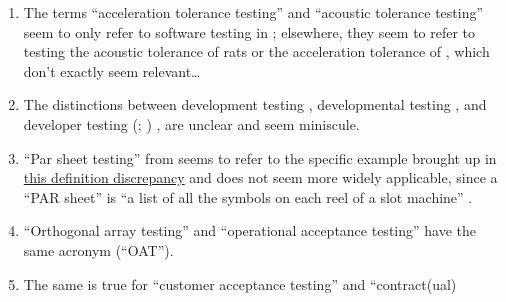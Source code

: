 \begin{enumerate}
    \item %
          The terms ``acceleration tolerance testing'' and ``acoustic tolerance
          testing'' seem to only refer to software testing in
          \citep[p.~56]{Firesmith2015};
          elsewhere, they seem to refer to testing the acoustic tolerance of
          rats \citep{HolleyEtAl1996} or the acceleration tolerance of
          \accelTolTest{}, which don't exactly seem relevant\dots%
    \item %
          The distinctions between development testing \citep[p.~136]{IEEE2017},
          developmental testing \citep[p.~30]{Firesmith2015}, and developer
          testing
          \ifnotpaper
              (\citealp[p.~39]{Firesmith2015}; \citealp[p.~11]{Gerrard2000a})
          \else
              \cite[p.~39]{Firesmith2015}, \cite[p.~11]{Gerrard2000a}
          \fi are unclear and seem miniscule.
          \ifnotpaper
    \item %
          ``Par sheet testing'' from \citepISTQB{} seems to refer to the
          specific example brought up in \hyperref[specificISTQB]
          {this definition discrepancy} and does not seem more widely
          applicable, since a ``PAR sheet'' is ``a list of all the symbols
          on each reel of a slot machine'' \citep{Bluejay2024}.%
           \fi
    \item %
          ``Orthogonal array testing'' \ifnotpaper \citetext{%
                  \citealp[pp.~5-1,~5-11]{SWEBOK2024};
                  implied by \citealp[pp.~467,~473]{Valcheva2013};
                  \citealp[pp.~1573-1577,~1580]{YuEtAl2011}} \else
              \cite[pp.~5-1,~5-11]{SWEBOK2024} \fi and ``operational
          acceptance testing'' \citep[p.~30]{Firesmith2015} have the same
          acronym (``OAT''). \ifnotpaper
    \item %
          The same is true for ``customer acceptance testing'' and ``contract(ual)

\end{enumerate}

